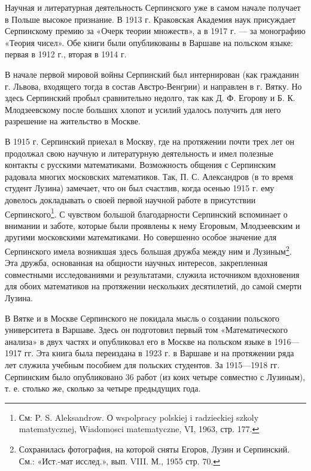 \documentclass[12pt, a4paper, openany]{book}
\begin{document}
Научная и литературная деятельность Серпинского уже в самом начале получает в Польше высокое признание. В 1913 г. Краковская Академия наук присуждает Серпинскому премию за «Очерк теории множеств», а в 1917 г. — за монографию «Теория чисел». Обе книги были опубликованы в Варшаве на польском языке: первая в 1912 г., вторая в 1914 г.

В начале первой мировой войны Серпинский был интернирован (как гражданин г. Львова, входящего тогда в состав Австро-Венгрии) и направлен в г. Вятку. Но здесь Серпинский пробыл сравнительно недолго, так как Д. Ф. Егорову и Б. К. Млодзеевскому после больших хлопот и усилий удалось получить для него разрешение на жительство в Москве.

В 1915 г. Серпинский приехал в Москву, где на протяжении почти трех лет он продолжал свою научную и литературную деятельность и имел полезные контакты с русскими математиками. Возможность общения с Серпинским радовала многих московских математиков. Так, П. С. Александров (в то время студент Лузина) замечает, что он был счастлив, когда осенью 1915 г. ему довелось докладывать о своей первой научной работе в присутствии Серпинского{\footnote{См: P. S. Aleksandrow. О wspolpracy polskiej i radzieckiej szkoly matematycznej, Wiadomosci matematyczne, VI, 1963, стр. 177.
}}. С чувством большой благодарности Серпинский вспоминает о внимании и заботе, которые были проявлены к нему Егоровым, Млодзеевским и другими московскими математиками. Но совершенно особое значение для Серпинского имела возникшая здесь большая дружба между ним и Лузиным{\footnote{Сохранилась фотография, на которой сняты Егоров, Лузин и Серпинский. См.: «Ист.-мат исслед.», вып. VIII. М., 1955 стр. 70.}}. Эта дружба, основанная на общности научных интересов, закрепленная совместными исследованиями и результатами, служила источником вдохновения для обоих математиков на протяжении нескольких десятилетий, до самой смерти Лузина.

В Вятке и в Москве Серпинского не покидала мысль о создании польского университета в Варшаве. Здесь он подготовил первый том «Математического анализа» в двух частях и опубликовал его в Москве на польском языке в 1916—1917 гг. Эта книга была переиздана в 1923 г. в Варшаве и на протяжении ряда лет служила учебным пособием для польских студентов. За 1915—1918 гг. Серпинским было опубликовано 36 работ (из коих четыре совместно с Лузиным), т. е. столько же, сколько за четыре предыдущих года.
	
	\newpage
	\tableofcontents
	
	\thispagestyle{empty} %
	
\end{document}
